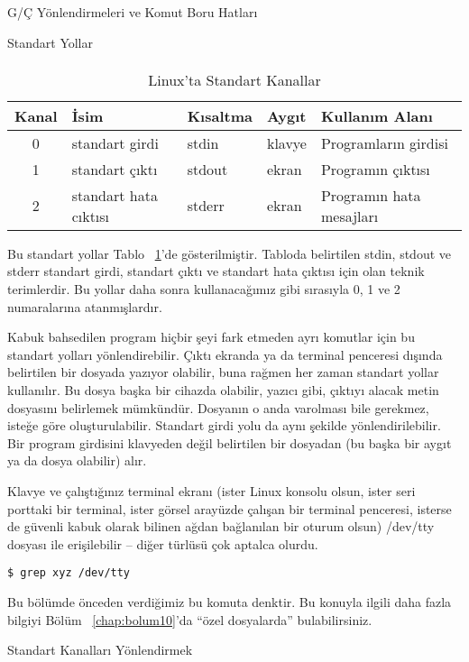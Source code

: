 \begin{section}{G/Ç Yönlendirmeleri ve Komut Boru Hatları}
\begin{subsection}{Standart Yollar}
\paragraph{}{
\begin {table}[H]
\caption {Linux'ta Standart Kanallar} \label{tab:tablo81} 
\begin{tabular}{c l l l l}
\hline
Kanal & İsim & Kısaltma & Aygıt & Kullanım Alanı\\
\hline
0	& standart girdi &		stdin	&	klavye	&   Programların girdisi\\
1	&standart çıktı&      	stdout&		ekran&	   Programın çıktısı\\
2 	&standart hata cıktısı  &       stderr	&	ekran	&   Programın hata mesajları \\
\hline
\end{tabular}
\end {table}
}

Bu standart yollar Tablo ~\ref{tab:tablo81}'de gösterilmiştir. Tabloda belirtilen stdin, stdout ve stderr standart girdi, standart çıktı ve standart hata çıktısı için olan teknik terimlerdir. Bu yollar daha sonra kullanacağımız gibi sırasıyla 0, 1 ve 2 numaralarına atanmışlardır.

Kabuk bahsedilen program hiçbir şeyi fark etmeden ayrı komutlar için bu standart yolları yönlendirebilir. Çıktı ekranda ya da terminal penceresi dışında belirtilen bir dosyada yazıyor olabilir, buna rağmen her zaman standart yollar kullanılır. Bu dosya başka bir cihazda olabilir, yazıcı gibi, çıktıyı alacak metin dosyasını belirlemek mümkündür. Dosyanın o anda varolması bile gerekmez, isteğe göre oluşturulabilir. Standart girdi yolu da aynı şekilde yönlendirilebilir. Bir program girdisini klavyeden değil belirtilen bir dosyadan (bu başka bir aygıt ya da dosya olabilir) alır.

Klavye ve çalıştığınız terminal ekranı (ister Linux konsolu olsun, ister seri porttaki bir terminal, ister görsel arayüzde çalışan bir terminal penceresi, isterse de güvenli kabuk olarak bilinen ağdan bağlanılan bir oturum olsun) /dev/tty dosyası ile erişilebilir – diğer türlüsü çok aptalca olurdu.
\footnotesize
\begin{verbatim}
$ grep xyz /dev/tty 
\end{verbatim}
\normalsize

Bu bölümde önceden verdiğimiz bu komuta denktir. Bu konuyla ilgili daha fazla bilgiyi Bölüm ~\ref{chap:bolum10}'da “özel dosyalarda” bulabilirsiniz.
\end{subsection}
\begin{subsection}{Standart Kanalları Yönlendirmek}


\end{subsection}
\end{section}
